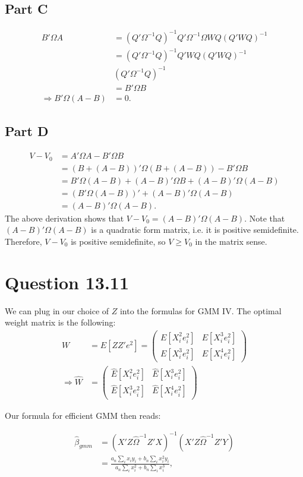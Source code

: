 \documentclass[11pt]{article} %
\begin{document}
\subsection{Part C}
\begin{align*}
B'\Omega A &= (Q'\Omega^{-1}Q)^{-1}Q' \Omega^{-1}\Omega WQ(Q'WQ)^{-1} \\
&= (Q'\Omega^{-1}Q)^{-1}Q'WQ(Q'WQ)^{-1}\\ 
&(Q'\Omega^{-1}Q)^{-1}\\
&= B'\Omega B \\
\Rightarrow B'\Omega (A-B) &= 0.
\end{align*}
\subsection{Part D}
\begin{align*} 
V - V_0 &= A'\Omega A - B'\Omega B \\
&= (B+(A-B))'\Omega(B+(A-B)) - B'\Omega B\\
&= B'\Omega(A-B) + (A-B)'\Omega B + (A-B)'\Omega (A-B)\\
&= (B'\Omega(A-B))' +(A-B)'\Omega (A-B)\\
&= (A-B)'\Omega (A-B).
\end{align*}
The above derivation shows that $V-V_0 = (A-B)'\Omega (A-B).$  Note that $(A-B)'\Omega (A-B)$ is a quadratic form matrix, i.e. it is positive semidefinite. Therefore, $V-V_0$ is positive semidefinite, so $V\geq V_0$ in the matrix sense.
\section{Question 13.11}
We can plug in our choice of $Z$ into the formulas for GMM IV. The optimal weight matrix is the following:
\begin{align*}
W &= E[ZZ'e^2] = \begin{pmatrix} E[X_i^2e_i^2] & E[X_i^3e_i^2] \\ E[X_i^3e_i^2] & E[X_i^4e_i^2] \end{pmatrix}\\
\Rightarrow \hat{W} &= \begin{pmatrix} \hat{E}[X_i^2e_i^2] & \hat{E}[X_i^3e_i^2] \\ \hat{E}[X_i^3e_i^2] & \hat{E}[X_i^4e_i^2] \end{pmatrix}
\end{align*}

Our formula for efficient GMM then reads:

\begin{align*}
\hat{\beta}_{gmm} &= (X'Z\hat{\Omega}^{-1}Z'X)^{-1}(X'Z\hat{\Omega}^{-1}Z'Y)\\
&= \frac{a_n \sum_i x_iy_i +b_n\sum_ix_i^2y_i}{a_n \sum_i x_i^2 +b_n \sum_i x_i^3},
\end{align*}
\end{document}
